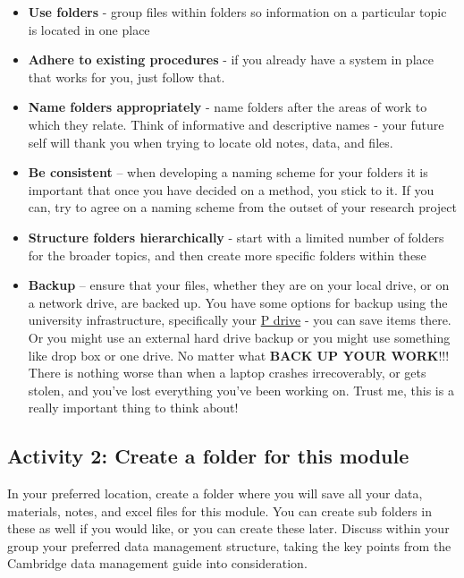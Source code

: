 \documentclass[
]{book}
\providecommand{\tightlist}{%
  \setlength{\itemsep}{0pt}\setlength{\parskip}{0pt}}
\begin{document}
\begin{itemize}
\tightlist
\item
  \textbf{Use folders} - group files within folders so information on a particular topic is located in one place
\item
  \textbf{Adhere to existing procedures} - if you already have a system in place that works for you, just follow that.
\item
  \textbf{Name folders appropriately} - name folders after the areas of work to which they relate. Think of informative and descriptive names - your future self will thank you when trying to locate old notes, data, and files.
\item
  \textbf{Be consistent} -- when developing a naming scheme for your folders it is important that once you have decided on a method, you stick to it. If you can, try to agree on a naming scheme from the outset of your research project
\item
  \textbf{Structure folders hierarchically} - start with a limited number of folders for the broader topics, and then create more specific folders within these
\item
  \textbf{Backup} -- ensure that your files, whether they are on your local drive, or on a network drive, are backed up. You have some options for backup using the university infrastructure, specifically your \href{https://pdrives.manchester.ac.uk/horde/login.php}{P drive} - you can save items there. Or you might use an external hard drive backup or you might use something like drop box or one drive. No matter what \textbf{BACK UP YOUR WORK}!!! There is nothing worse than when a laptop crashes irrecoverably, or gets stolen, and you've lost everything you've been working on. Trust me, this is a really important thing to think about!
\end{itemize}

\hypertarget{activity-2-create-a-folder-for-this-module}{%
\subsection{Activity 2: Create a folder for this module}\label{activity-2-create-a-folder-for-this-module}}

In your preferred location, create a folder where you will save all your data, materials, notes, and excel files for this module. You can create sub folders in these as well if you would like, or you can create these later. Discuss within your group your preferred data management structure, taking the key points from the Cambridge data management guide into consideration.
\end{document}
